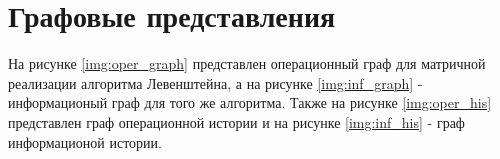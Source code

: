 \section{Графовые представления}

На рисунке \ref{img:oper_graph} представлен операционный граф для матричной реализации алгоритма Левенштейна, а на рисунке \ref{img:inf_graph} - информационый граф для того же алгоритма. Также на рисунке \ref{img:oper_his} представлен граф операционной истории и на рисунке \ref{img:inf_his} - граф информационой истории.


